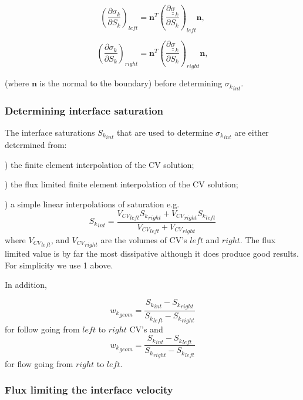 \documentclass[preprint,authoryear,12pt]{elsarticle}
\begin{document}
{\begin{equation}
\left({\frac{\partial \sigma_k}{\partial S_k}}\right)_{left} = 
{\mathbf n}^T \left( {\frac{\partial {\underline {\underline \sigma}}_k}{\partial S_k}}\right)_{left} {\mathbf n}, 
\end{equation}

\begin{equation}
\left({\frac{\partial \sigma_k}{\partial S_k}}\right)_{right} = {\mathbf n}^T 
\left( \frac{\partial {\underline {\underline \sigma}}_k}{\partial S_k}\right)_{right} {\mathbf n}, 
\end{equation}

(where ${\mathbf n}$ is the normal to the boundary) 
before determining ${\sigma_k}_{int}$.  


\subsubsection{Determining interface saturation  }
The interface saturations ${S_k}_{int}$ that are used to determine 
${\sigma_k}_{int}$ are either determined from:
\par{}) the finite element interpolation of the CV solution;
\par{}) the flux limited finite element interpolation of the CV solution; 
\par{}) a simple linear interpolations of saturation 
e.g.
\begin{equation}
{S_k}_{int} = 
\frac{
{V_{CV}}_{left} {S_k}_{right} +{V_{CV}}_{right} {S_k}_{left}
} { {V_{CV}}_{left} + {V_{CV}}_{right} }  
\end{equation}
where ${V_{CV}}_{left}$, 
and $ {V_{CV}}_{right}$ are the volumes of CV's $left$ and $right$. 
The flux limited value is by far the most dissipative although 
it does produce good results. For simplicity we use 1 above. 

In addition, 

\begin{equation}
{w_k}_{geom} = \frac{ {S_k}_{int} - {S_k}_{right} }
{ {S_k}_{left} - {S_k}_{right} }
\end{equation}
for follow going from $left$ to $right$ CV's and 
\begin{equation}
{w_k}_{geom} = \frac{ {S_k}_{int} - {S_k}_{left} }
{ {S_k}_{right} - {S_k}_{left} }
\end{equation}
for flow going from $right$ to $left$. 


 
\subsubsection{Flux limiting the interface velocity  }

}
\end{document}
